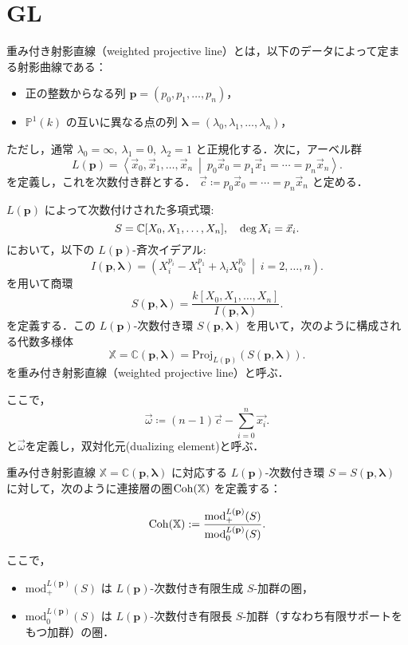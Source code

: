 \section{GL}
\begin{defn}\cite{GL87}
重み付き射影直線（weighted projective line）とは，以下のデータによって定まる射影曲線である：

\begin{itemize}
  \item 正の整数からなる列 $\mathbf{p} = (p_0, p_1, \dots, p_n)$，
  \item $\mathbb{P}^1(k)$ の互いに異なる点の列 $\boldsymbol{\lambda} = (\lambda_0, \lambda_1, \dots, \lambda_n)$，
\end{itemize}

ただし，通常 $\lambda_0 = \infty,\ \lambda_1 = 0,\ \lambda_2 = 1$ と正規化する．次に，アーベル群
\[
L(\mathbf{p}) = \left\langle \vec{x}_0, \vec{x}_1, \dots, \vec{x}_n \ \middle| \ p_0 \vec{x}_0 = p_1 \vec{x}_1 = \cdots = p_n \vec{x}_n \right\rangle .
\]
を定義し，これを次数付き群とする． $\vec{c}\coloneq p_0 \vec{x}_0 = \cdots = p_n \vec{x}_n$ と定める．

$L(\mathbf{p})$ によって次数付けされた多項式環:
\[
S = {\mathbb C}[X_0, X_1, \dots, X_n], \quad \deg X_i = \vec{x}_i.
\]
において，以下の $L(\mathbf{p})$-斉次イデアル:
\[
I(\mathbf{p}, \boldsymbol{\lambda}) = \left( X_i^{p_i} - X_1^{p_1} + \lambda_i X_0^{p_0} \ \middle|\ i = 2, \dots, n \right).
\]
を用いて商環
\[
S(\mathbf{p}, \boldsymbol{\lambda}) = \frac{k[X_0, X_1, \dots, X_n]}{I(\mathbf{p}, \boldsymbol{\lambda})}.
\]
を定義する．この $L(\mathbf{p})$-次数付き環 $S(\mathbf{p}, \boldsymbol{\lambda})$ を用いて，次のように構成される代数多様体
\[
\mathbb{X} = \mathbb{C}(\mathbf{p}, \boldsymbol{\lambda}) = \mathrm{Proj}_{L(\mathbf{p})}(S(\mathbf{p}, \boldsymbol{\lambda})).
\]
を重み付き射影直線（weighted projective line）と呼ぶ．
\end{defn}
ここで，
\[\vec{\omega} \coloneq (n-1)\vec{c} - \sum_{i=0}^n\vec{x_i}.\]
と$\vec{\omega}$を定義し，双対化元(dualizing element)と呼ぶ．

\begin{defn}\cite{GL87}
重み付き射影直線 $\mathbb{X} = \mathbb{C}(\mathbf{p}, \boldsymbol{\lambda})$ に対応する $L(\mathbf{p})$-次数付き環 $S = S(\mathbf{p}, \boldsymbol{\lambda})$ に対して，次のように連接層の圏$\operatorname{\mathrm{Coh}}(\mathbb{X})$ を定義する：

\[
\operatorname{\mathrm{Coh}}(\mathbb{X}) := \frac{\mathrm{mod}^{L(\mathbf{p})}_+(S)}{\mathrm{mod}^{L(\mathbf{p})}_0(S)}.
\]

ここで，
\begin{itemize}
  \item $\mathrm{mod}^{L(\mathbf{p})}_+(S)$ は $L(\mathbf{p})$-次数付き有限生成 $S$-加群の圏，
  \item $\mathrm{mod}^{L(\mathbf{p})}_0(S)$ は $L(\mathbf{p})$-次数付き有限長 $S$-加群（すなわち有限サポートをもつ加群）の圏．
\end{itemize}
\end{defn}

